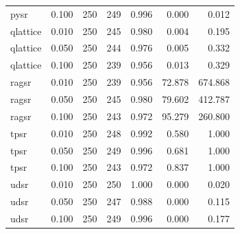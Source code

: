 \begin{table}
\begin{tabular}{lrrrrrr}
pysr & 0.100 & 250 & 249 & 0.996 & 0.000 & 0.012 \\
qlattice & 0.010 & 250 & 245 & 0.980 & 0.004 & 0.195 \\
qlattice & 0.050 & 250 & 244 & 0.976 & 0.005 & 0.332 \\
qlattice & 0.100 & 250 & 239 & 0.956 & 0.013 & 0.329 \\
ragsr & 0.010 & 250 & 239 & 0.956 & 72.878 & 674.868 \\
ragsr & 0.050 & 250 & 245 & 0.980 & 79.602 & 412.787 \\
ragsr & 0.100 & 250 & 243 & 0.972 & 95.279 & 260.800 \\
tpsr & 0.010 & 250 & 248 & 0.992 & 0.580 & 1.000 \\
tpsr & 0.050 & 250 & 249 & 0.996 & 0.681 & 1.000 \\
tpsr & 0.100 & 250 & 243 & 0.972 & 0.837 & 1.000 \\
udsr & 0.010 & 250 & 250 & 1.000 & 0.000 & 0.020 \\
udsr & 0.050 & 250 & 247 & 0.988 & 0.000 & 0.115 \\
udsr & 0.100 & 250 & 249 & 0.996 & 0.000 & 0.177 \\
\bottomrule
\end{tabular}
\end{table}
